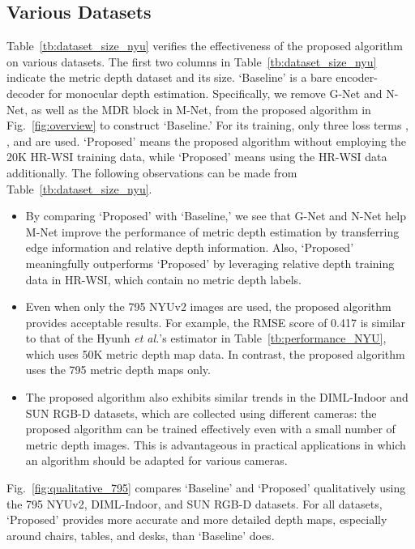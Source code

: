 \documentclass[runningheads]{llncs}
\newcommand{\etal}{\textit{et al.}}
\begin{document}
\subsection{Various Datasets}
Table~\ref{tb:dataset_size_nyu} verifies the effectiveness of the proposed algorithm on various datasets.
The first two columns in Table~\ref{tb:dataset_size_nyu} indicate the metric depth dataset and its size. `Baseline' is a bare encoder-decoder for monocular depth estimation. Specifically, we remove G-Net and N-Net, as well as the MDR block in M-Net, from the proposed algorithm in Fig.~\ref{fig:overview} to construct `Baseline.' For its training, only three loss terms , , and  are used. `Proposed' means the proposed algorithm without employing the 20K HR-WSI training data, while `Proposed' means using the HR-WSI data additionally. The following observations can be made from Table~\ref{tb:dataset_size_nyu}.
\begin{itemize}
\itemsep0mm
\item By comparing `Proposed' with `Baseline,' we see that G-Net and N-Net help M-Net improve the performance of metric depth estimation by transferring edge information and relative depth information. Also, `Proposed' meaningfully outperforms `Proposed' by leveraging relative depth training data in HR-WSI, which contain no metric depth labels.
\item Even when only the 795 NYUv2 images are used, the proposed algorithm provides acceptable results. For example, the RMSE score of 0.417 is similar to that of the Hyunh \etal's estimator \cite{huynh2020guiding} in Table~\ref{tb:performance_NYU}, which uses 50K metric depth map data. In contrast, the proposed algorithm uses the 795 metric depth maps only.
\item The proposed algorithm also exhibits similar trends in the DIML-Indoor and SUN RGB-D datasets, which are collected using different cameras: the proposed algorithm can be trained effectively even with a small number of metric depth images. This is advantageous in practical applications in which an algorithm should be adapted for various cameras.
\end{itemize}
Fig.~\ref{fig:qualitative_795} compares `Baseline' and `Proposed' qualitatively using the 795 NYUv2, DIML-Indoor, and SUN RGB-D datasets. For all datasets, `Proposed' provides more accurate and more detailed depth maps, especially around chairs, tables, and desks, than `Baseline' does.
\end{document}
